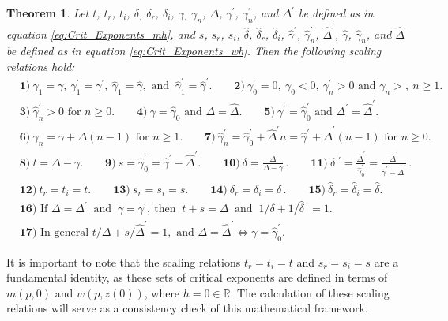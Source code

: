 \documentclass[english,12pt,jmp,graphicx]{revtex4-1}
\newtheorem{theorem}{Theorem}[section]
\newcommand{\gh}{\hat{\gamma}}
\newcommand{\Dh}{\hat{\Delta}}
\newcommand{\dha}{\hat{\delta}}
\begin{document}
\begin{theorem} \label{thm:Crit_Theory_m_w}
  Let $t$, $t_r$, $t_i$, $\delta$, $\delta_r$, $\delta_i$, $\gamma$, $\gamma_n$, $\Delta$, $\gamma^\prime$, $\gamma_n^\prime$,
  and $\Delta^\prime$ be defined as in equation \eqref{eq:Crit_Exponents_mh},
  and $s$, $s_r$, $s_i$, $\dha$, $\dha_r$, $\dha_i$, $\gh^\prime$, $\gh_n^\prime$,
  $\Dh^\prime$, $\gh$, $\gh_n$, and $\Dh$ be defined as in equation
  \eqref{eq:Crit_Exponents_wh}. Then the following scaling relations
  hold:
%  
  \begin{align*}   
   &\mathbf{1)} \ \gamma_1=\gamma, \ \gamma_1^\prime=\gamma^\prime, \ \gh_1=\gh, \text{ and } \ \gh_1^\prime=\gh^\prime. \qquad
     \mathbf{2)} \ \gamma_0^\prime=0, \ \gamma_0<0, \ \gamma_n^\prime>0 \text{ and } \gamma_n>, \ n\geq1.\\
   &\mathbf{3)} \ \gh_n^\prime>0 \text{ for } n\geq0. \qquad
   \mathbf{4)} \ \gamma=\gh_0 \text{ and } \Delta=\Dh. \qquad
   \mathbf{5)} \ \gamma^\prime=\gh_0^\prime \text{ and } \Delta^\prime=\Dh^\prime. \\
   &\mathbf{6)} \ \gamma_n=\gamma+\Delta(n-1) \text{ for } n\geq1. \qquad
   \mathbf{7)} \ \gh_n^\prime=\gh_0^\prime+\Dh^\prime n=\gh^\prime+\Dh^\prime(n-1) \text{ for } n\geq0. \\
   &\mathbf{8)} \ t=\Delta-\gamma. \qquad 
   \mathbf{9)} \ s=\gh_0^\prime=\gh^\prime-\Dh^\prime. \qquad
   \mathbf{10)} \ \delta=\frac{\Delta}{\Delta-\gamma}\,. \qquad
   \mathbf{11)} \ \dha\;^\prime=\frac{\Dh^\prime}{\gh_0^\prime}=\frac{\Dh^\prime}{\gh^\prime-\Dh^\prime}\,. \\
   &\mathbf{12)} \ t_r=t_i=t. \qquad
   \mathbf{13)} \ s_r=s_i=s. \qquad
   \mathbf{14)}  \ \delta_r=\delta_i=\delta\,. \qquad
   \mathbf{15)} \ \dha_r=\dha_i=\dha. \\
   &\mathbf{16)} \text{ If } \Delta=\Delta^\prime \ \text{ and } \ \gamma=\gamma^\prime, \ \text{
     then } \ t+s=\Delta \ \text{ and } \ 1/\delta+1/\dha\,^\prime=1.\\
   &\mathbf{17)} \text{ In general } t/\Delta+s/\Dh^\prime=1, \text{ and }  \Delta=\Dh^\prime\iff\gamma=\gh_0^\prime.
  \end{align*}
%  
\end{theorem}
%
It is important to note that the scaling relations $t_r=t_i=t$ and
$s_r=s_i=s$ are a fundamental identity, as these sets of critical
exponents are defined in terms of $m(p,0)$ and $w(p,z(0))$, where
$h=0\in\mathbb{R}$. The calculation of these scaling relations will
serve as a consistency check of this mathematical framework.
\end{document}
